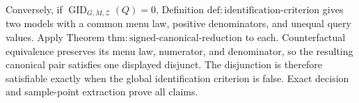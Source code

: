 Conversely, if \(\operatorname{GID}_{G,M,\mathcal Z}(Q)=0\), Definition \(\mathrm{def:identification\text{-}criterion}\) gives two models with a common menu law, positive denominators, and unequal query values.  Apply Theorem \(\mathrm{thm:signed\text{-}canonical\text{-}reduction}\) to each.  Counterfactual equivalence preserves its menu law, numerator, and denominator, so the resulting canonical pair satisfies one displayed disjunct.  The disjunction is therefore satisfiable exactly when the global identification criterion is false.  Exact decision and sample-point extraction prove all claims.